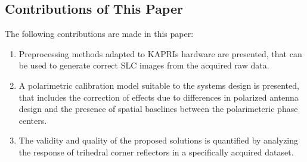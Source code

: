 \subsection{Contributions of This Paper}
The following contributions are made in this paper:
\begin{enumerate}
	\item Preprocessing methods adapted to KAPRIs hardware are presented, that can be used to generate correct SLC images from the acquired raw data.
	\item A polarimetric calibration model suitable to the systems design is presented, that includes the correction of effects due to differences in polarized antenna design and the presence of spatial baselines between the polarimeteric phase centers.
	\item The validity and quality of the proposed solutions is  quantified by analyzing the response of trihedral corner reflectors in a specifically acquired dataset.
\end{enumerate}

